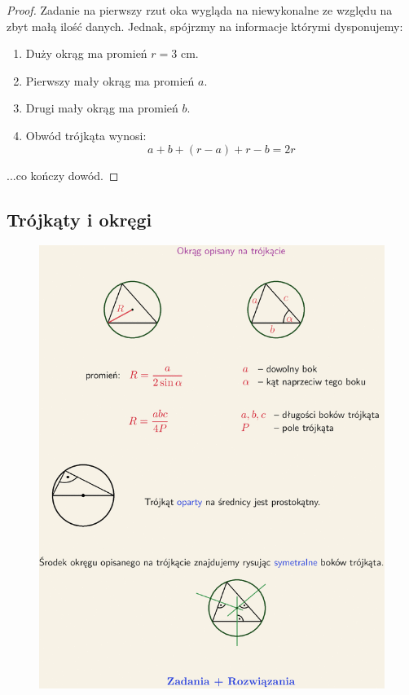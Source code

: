 \documentclass[11pt]{article}
\theoremstyle{definition}
\begin{document}
\begin{proof}
Zadanie na pierwszy rzut oka wygląda na niewykonalne ze względu na zbyt małą ilość danych. Jednak, spójrzmy na informacje którymi dysponujemy:

\begin{enumerate}
\item Duży okrąg ma promień $r = 3$ cm.
\item Pierwszy mały okrąg ma promień $a$.
\item Drugi mały okrąg ma promień $b$.
\item Obwód trójkąta wynosi:
$$a+b + (r-a) + r-b = 2r$$
\end{enumerate}
...co kończy dowód.
\end{proof}

\subsection{Trójkąty i okręgi}

\begin{figure}
\centering
\includegraphics[width=0.8\linewidth]{circle1.png}
\end{figure}
\end{document}
